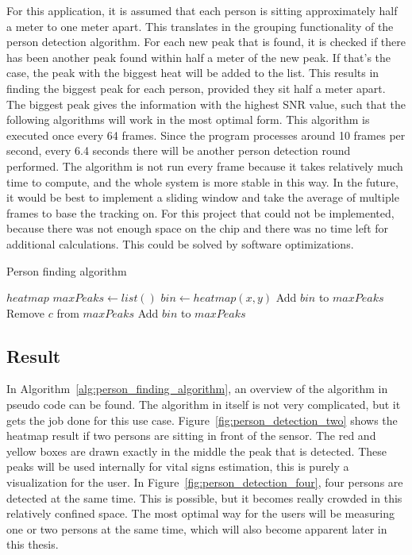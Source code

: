 For this application, it is assumed that each person is sitting approximately half a meter to one meter apart. This translates in the grouping functionality of the person detection algorithm. For each new peak that is found, it is checked if there has been another peak found within half a meter of the new peak. If that's the case, the peak with the biggest heat will be added to the list. This results in finding the biggest peak for each person, provided they sit half a meter apart. The biggest peak gives the information with the highest SNR value, such that the following algorithms will work in the most optimal form. This algorithm is executed once every 64 frames. Since the program processes around 10 frames per second, every 6.4 seconds there will be another person detection round performed. The algorithm is not run every frame because it takes relatively much time to compute, and the whole system is more stable in this way. In the future, it would be best to implement a sliding window and take the average of multiple frames to base the tracking on. For this project that could not be implemented, because there was not enough space on the chip and there was no time left for additional calculations. This could be solved by software optimizations.

\begin{algorithm}
\caption{Person finding algorithm}\label{alg:person_finding_algorithm}
\begin{algorithmic}
\Require $heatmap$
\State $maxPeaks \gets list()$
        \State $bin \gets heatmap(x, y)$
                        \State Add $bin$ to $maxPeaks$
                        \State Remove $c$ from $maxPeaks$
                    \EndIf
                \Else
                    \State Add $bin$ to $maxPeaks$
                \EndIf
            \EndIf
        \EndIf
    \EndFor
\EndFor
\end{algorithmic}
\end{algorithm}

\subsection{Result}
In Algorithm~\ref{alg:person_finding_algorithm}, an overview of the algorithm in pseudo code can be found. The algorithm in itself is not very complicated, but it gets the job done for this use case. Figure~\ref{fig:person_detection_two} shows the heatmap result if two persons are sitting in front of the sensor. The red and yellow boxes are drawn exactly in the middle the peak that is detected. These peaks will be used internally for vital signs estimation, this is purely a visualization for the user. In Figure~\ref{fig:person_detection_four}, four persons are detected at the same time. This is possible, but it becomes really crowded in this relatively confined space. The most optimal way for the users will be measuring one or two persons at the same time, which will also become apparent later in this thesis. 

